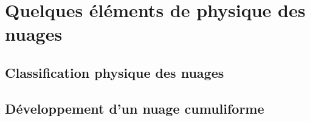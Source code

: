 \mk
\section{Quelques éléments de physique des nuages}

\sk
\subsection{Classification physique des nuages} \label{classphys}
	

\sk
\subsection{Développement d'un nuage cumuliforme}
	
	
